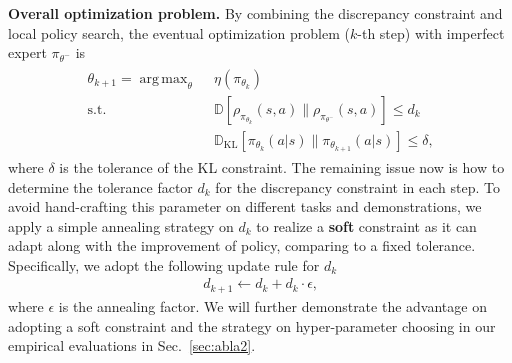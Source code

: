 \documentclass[letterpaper]{article} %
\DeclareMathOperator*{\argmax}{arg\,max}
\begin{document}
\noindent
\textbf{Overall optimization problem.} By combining the discrepancy constraint and local policy search, the eventual optimization problem ($k$-th step) with imperfect expert $\pi_{\theta^{-}}$ is
\begin{align}
\begin{split}\label{equ:final_objective}
    \theta_{k+1} = \argmax_\theta~~& \eta(\pi_{\theta_k}) \\
    \text{s.t.}~~&\mathbb{D}\left[\rho_{\pi_{\theta_k}}(s, a) \| \rho_{\pi_{\theta^{-}}}(s, a)\right] \leqslant d_k \\
    &\mathbb{D}_{\operatorname{KL}}\left[\pi_{\theta_k}(a|s) \| \pi_{\theta_{k+1}}(a|s)\right] \leqslant \delta\text{,}
\end{split}
\end{align}
where $\delta$ is the tolerance of the KL constraint. The remaining issue now is how to determine the tolerance factor $d_k$ for the discrepancy constraint in each step. To avoid hand-crafting this parameter on different tasks and demonstrations, we apply a simple annealing strategy on $d_k$ to realize a \textbf{soft} constraint as it can adapt along with the improvement of policy, comparing to a fixed tolerance. Specifically, we adopt the following update rule for $d_k$
\begin{align}
    d_{k+1} \leftarrow d_k + d_k \cdot \epsilon\text{,}
\end{align}
where $\epsilon$ is the annealing factor. We will further demonstrate the advantage on adopting a soft constraint and the strategy on hyper-parameter choosing in our empirical evaluations in Sec.~\ref{sec:abla2}.
\end{document}

